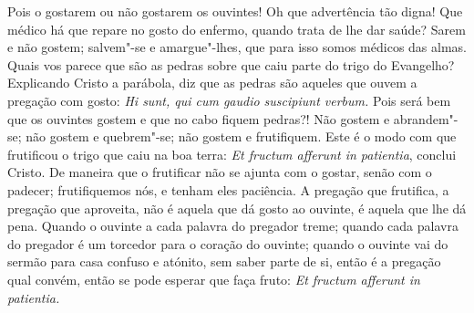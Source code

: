 Pois o gostarem ou não gostarem os ouvintes! Oh que advertência tão
digna! Que médico há que repare no gosto do enfermo, quando trata de lhe
dar saúde? Sarem e não gostem; salvem"-se e amargue"-lhes, que para isso
somos médicos das almas. Quais vos parece que são as pedras sobre que
caiu parte do trigo do Evangelho? Explicando Cristo a parábola, diz
que as pedras são aqueles que ouvem a pregação com gosto: \emph{Hi
sunt, qui cum gaudio suscipiunt verbum.} Pois será bem que os ouvintes
gostem e que no cabo fiquem pedras?! Não gostem e abrandem"-se; não
gostem e quebrem"-se; não gostem e frutifiquem. Este é o modo com que
frutificou o trigo que caiu na boa terra: \emph{Et fructum afferunt in
patientia}, conclui Cristo. De maneira que o frutificar não se
ajunta com o gostar, senão com o padecer; frutifiquemos nós, e tenham
eles paciência. A pregação que frutifica, a pregação que aproveita, não
é aquela que dá gosto ao ouvinte, é aquela que lhe dá pena. Quando o
ouvinte a cada palavra do pregador treme; quando cada palavra do
pregador é um torcedor para o coração do ouvinte; quando o ouvinte vai
do sermão para casa confuso e atónito, sem saber parte de si, então é a
pregação qual convém, então se pode esperar que faça fruto: \emph{Et
fructum afferunt in patientia.}

